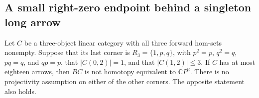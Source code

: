 \subsection{A small right-zero endpoint behind a singleton long arrow}

\begin{theorem}\label{C:right-zero-small-last-stalk}
Let $C$ be a three-object linear category with all three forward
hom-sets nonempty. Suppose that its last corner is
$R_3=\{1,p,q\}$, with $p^2=p$, $q^2=q$, $pq=q$, and $qp=p$, that
$|C(0,2)|=1$, and that $|C(1,2)|\leq3$.
If $C$ has at most eighteen arrows, then $BC$ is not homotopy
equivalent to $\mathbb CP^2$. There is no projectivity
assumption on either of the other corners. The opposite
statement also holds.
\end{theorem}
